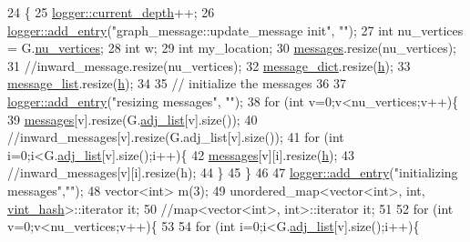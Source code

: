 \begin{DoxyCode}
24 \{
25   \hyperlink{classlogger_a9d29b49bd318a719a8e85b59eac54fe0}{logger::current\_depth}++;
26   \hyperlink{classlogger_a710163deb17bc81f70d53d285b8ac9ac}{logger::add\_entry}(\textcolor{stringliteral}{"graph\_message::update\_message init"}, \textcolor{stringliteral}{""});
27   \textcolor{keywordtype}{int} nu\_vertices = G.\hyperlink{classmarked__graph_acf79c6aeb8f32614cb14a5baaa6c9f9b}{nu\_vertices};
28   \textcolor{keywordtype}{int} w;
29   \textcolor{keywordtype}{int} my\_location;
30   \hyperlink{classgraph__message_aac77e098f0acf9650116a8e51fe3b4b7}{messages}.resize(nu\_vertices);
31   \textcolor{comment}{//inward\_message.resize(nu\_vertices);}
32   \hyperlink{classgraph__message_ab54d89b122c2b1322da0d5db2043fb84}{message\_dict}.resize(\hyperlink{classgraph__message_a934d63ed7275c211e13c6fb68824ed46}{h});
33   \hyperlink{classgraph__message_aa17fdb629b423343edfafa97252763ef}{message\_list}.resize(\hyperlink{classgraph__message_a934d63ed7275c211e13c6fb68824ed46}{h});
34 
35   \textcolor{comment}{// initialize the messages}
36 
37   \hyperlink{classlogger_a710163deb17bc81f70d53d285b8ac9ac}{logger::add\_entry}(\textcolor{stringliteral}{"resizing messages"}, \textcolor{stringliteral}{""});
38   \textcolor{keywordflow}{for} (\textcolor{keywordtype}{int} v=0;v<nu\_vertices;v++)\{
39     \hyperlink{classgraph__message_aac77e098f0acf9650116a8e51fe3b4b7}{messages}[v].resize(G.\hyperlink{classmarked__graph_a1a0bf7ca413a278763f7c878b3b6fd6f}{adj\_list}[v].size());
40     \textcolor{comment}{//inward\_messages[v].resize(G.adj\_list[v].size());}
41     \textcolor{keywordflow}{for} (\textcolor{keywordtype}{int} i=0;i<G.\hyperlink{classmarked__graph_a1a0bf7ca413a278763f7c878b3b6fd6f}{adj\_list}[v].size();i++)\{
42       \hyperlink{classgraph__message_aac77e098f0acf9650116a8e51fe3b4b7}{messages}[v][i].resize(\hyperlink{classgraph__message_a934d63ed7275c211e13c6fb68824ed46}{h});
43       \textcolor{comment}{//inward\_messages[v][i].resize(h);}
44     \}
45   \}
46 
47   \hyperlink{classlogger_a710163deb17bc81f70d53d285b8ac9ac}{logger::add\_entry}(\textcolor{stringliteral}{"initializing messages"},\textcolor{stringliteral}{""});
48   vector<int> m(3);
49   unordered\_map<vector<int>, int, \hyperlink{structvint__hash}{vint\_hash}>::iterator it;
50   \textcolor{comment}{//map<vector<int>, int>::iterator it;}
51 
52   \textcolor{keywordflow}{for} (\textcolor{keywordtype}{int} v=0;v<nu\_vertices;v++)\{
53 
54     \textcolor{keywordflow}{for} (\textcolor{keywordtype}{int} i=0;i<G.\hyperlink{classmarked__graph_a1a0bf7ca413a278763f7c878b3b6fd6f}{adj\_list}[v].size();i++)\{

\end{DoxyCode}
